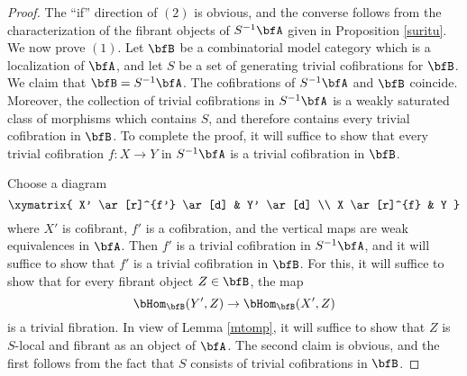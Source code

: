 \begin{proof}
The ``if'' direction of $(2)$ is obvious, and the converse follows from the characterization of the fibrant objects of $S^{-1} \bfA$ given in Proposition \ref{suritu}. We now prove $(1)$. Let $\bfB$ be a combinatorial model category which is a localization of $\bfA$, and let $S$ be a set of generating trivial cofibrations for $\bfB$. We claim that $\bfB = S^{-1} \bfA$. The cofibrations of $S^{-1} \bfA$ and $\bfB$ coincide. Moreover, the collection of trivial cofibrations in $S^{-1} \bfA$ is a weakly saturated class of morphisms which contains $S$, and therefore contains every trivial cofibration in $\bfB$. To complete the proof, it will suffice to show that every trivial cofibration $f: X \rightarrow Y$ in $S^{-1} \bfA$ is a trivial cofibration in $\bfB$.

Choose a diagram
$$ \xymatrix{ X' \ar[r]^{f'} \ar[d] & Y' \ar[d] \\
X \ar[r]^{f} & Y }$$
where $X'$ is cofibrant, $f'$ is a cofibration, and the vertical maps are weak equivalences in $\bfA$. Then $f'$ is a trivial cofibration in $S^{-1} \bfA$, and it will suffice to show that $f'$ is a trivial cofibration in $\bfB$. For this, it will suffice to show that for every fibrant object $Z \in \bfB$, the map
$$ \bHom_{\bfB}(Y', Z) \rightarrow \bHom_{\bfB}(X',Z)$$ is a trivial fibration. In view of Lemma \ref{mtomp}, it will suffice to show that $Z$ is $S$-local and fibrant as an object of $\bfA$. The second claim is obvious, and the first follows from the fact that $S$ consists of trivial cofibrations in $\bfB$. 
\end{proof}

